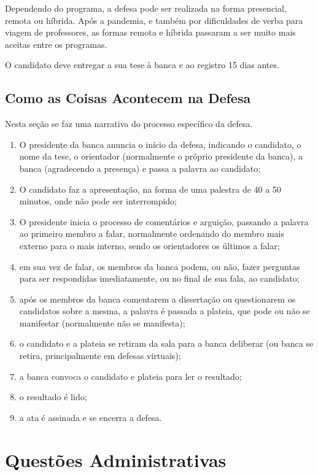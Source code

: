 Dependendo do programa, a defesa pode ser realizada na forma presencial, remota ou híbrida. Após a pandemia, e também por dificuldades de verba para viagem de professores, as formas remota e híbrida passaram a ser muito mais aceitas entre os programas.

O candidato deve entregar a sua tese  à banca e ao registro 15 dias antes.


\subsection{Como as Coisas Acontecem na Defesa}

Nesta seção se faz uma narrativa do processo específico da defesa.

\begin{enumerate}
    \item O presidente da banca anuncia o início da defesa, indicando o candidato, o nome da tese, o orientador (normalmente o próprio presidente da banca), a banca (agradecendo a presença) e passa a palavra ao candidato;
    \item O candidato faz a apresentação, na forma de uma palestra de 40 a 50 minutos, onde não pode ser interrompido;
    \item O presidente inicia o processo de comentários e arguição, passando a palavra ao primeiro membro a falar, normalmente ordenando do membro mais externo para o mais interno, sendo os orientadores os últimos a falar;
    \item em sua vez de falar, os membros da banca podem, ou não, fazer perguntas para ser respondidas imediatamente, ou no final de sua fala, ao candidato;
    \item após os membros da banca comentarem a dissertação ou questionarem os candidatos sobre a mesma, a palavra é passada a plateia, que pode ou não se manifestar (normalmente não se manifesta);
    \item o candidato e a plateia se retiram da sala para a banca deliberar (ou banca se retira, principalmente em defesas virtuais);
    \item a banca convoca o candidato e plateia para ler o resultado;
    \item o resultado é lido;
    \item a ata é assinada e se encerra a defesa.
\end{enumerate}


\section{Questões Administrativas}


